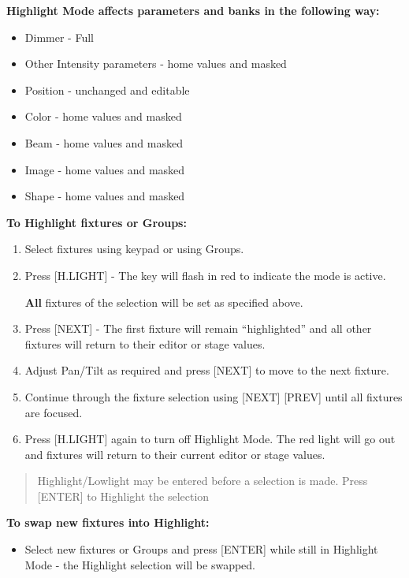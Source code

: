 \documentclass[
]{article}
\providecommand{\tightlist}{%
  \setlength{\itemsep}{0pt}\setlength{\parskip}{0pt}}
\begin{document}
\textbf{Highlight Mode affects parameters and banks in the following way:}

\begin{itemize}
\item
  Dimmer - Full
\item
  Other Intensity parameters - home values and masked
\item
  Position - unchanged and editable
\item
  Color - home values and masked
\item
  Beam - home values and masked
\item
  Image - home values and masked
\item
  Shape - home values and masked
\end{itemize}

\textbf{To Highlight fixtures or Groups:}

\begin{enumerate}
\def\labelenumi{\arabic{enumi}.}
\item
  Select fixtures using keypad or using Groups.
\item
  Press {[}H.LIGHT{]} - The key will flash in {red} to indicate the mode is active.

  \textbf{All} fixtures of the selection will be set as specified above.
\item
  Press {[}NEXT{]} - The first fixture will remain ``highlighted'' and all other fixtures will return to their editor or stage values.
\item
  Adjust Pan/Tilt as required and press {[}NEXT{]} to move to the next fixture.
\item
  Continue through the fixture selection using {[}NEXT{]} {[}PREV{]} until all fixtures are focused.
\item
  Press {[}H.LIGHT{]} again to turn off Highlight Mode. The red light will go out and fixtures will return to their current editor or stage values.
\end{enumerate}

\begin{quote}
Highlight/Lowlight may be entered before a selection is made. Press {[}ENTER{]} to Highlight the selection
\end{quote}

\textbf{To swap new fixtures into Highlight:}

\begin{itemize}
\tightlist
\item
  Select new fixtures or Groups and press {[}ENTER{]} while still in Highlight Mode - the Highlight selection will be swapped.
\end{itemize}
\end{document}
